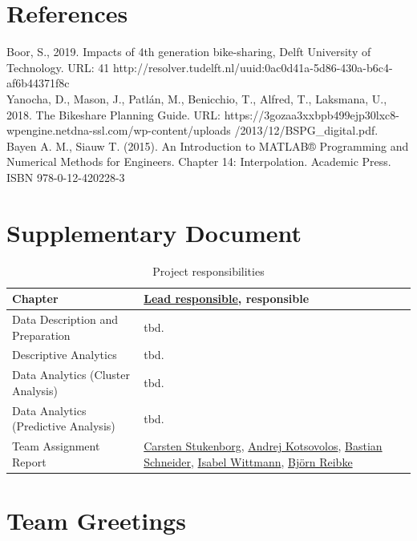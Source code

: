 \clearpage
\section{References}
\label{section: bib}

\qquad Boor, S., 2019. Impacts of 4th generation bike-sharing, Delft University of Technology. URL:
41 http://resolver.tudelft.nl/uuid:0ac0d41a-5d86-430a-b6c4-af6b44371f8c\\

\quad Yanocha, D., Mason, J., Patlán, M., Benicchio, T., Alfred, T., Laksmana, U., 2018. The Bikeshare Planning Guide. URL: https://3gozaa3xxbpb499ejp30lxc8-wpengine.netdna-ssl.com/wp-content/uploads
/2013/12/BSPG\_digital.pdf.\\

\quad Bayen A. M., Siauw T. (2015). An Introduction to MATLAB® Programming and Numerical Methods for Engineers. Chapter 14: Interpolation. Academic Press. ISBN 978-0-12-420228-3

\clearpage
\section{Supplementary Document}
\label{section: supplementary}
\begin{table}[H]
\centering
\begin{tabular}{p{}p{}}
\toprule
Chapter & \underline{Lead responsible}, responsible \\
\midrule
Data Description and Preparation
& 
tbd.\\

Descriptive Analytics
& 
tbd.\\

Data Analytics (Cluster Analysis)
& 
tbd. \\

Data Analytics (Predictive Analysis)
& 
tbd.\\

Team Assignment Report
& 
\underline{Carsten Stukenborg}, \underline{Andrej Kotsovolos}, \underline{Bastian Schneider}, \underline{Isabel Wittmann}, \underline{Björn Reibke}\\

\bottomrule
\end{tabular}
\caption[Project responsibilities]{Project responsibilities}
\label{Project responsibilities}
\end{table}

\clearpage
\section{Team Greetings}

